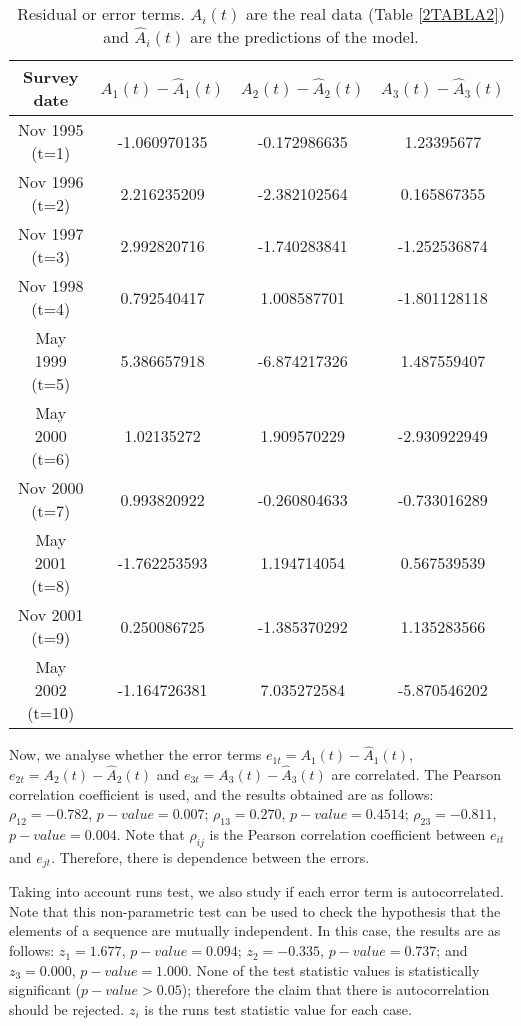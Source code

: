 \begin{table}[ht]
\centering
\begin{tabular}{|cccc|}
\hline
  Survey date  & $A_1(t)-\hat{A}_1(t)$ & $A_2(t)-\hat{A}_2(t)$ & $A_3(t)-\hat{A}_3(t)$ \\   
\hline
 Nov 1995 (t=1)  &-1.060970135& -0.172986635& 1.23395677	\\
 Nov 1996 (t=2)  &2.216235209 &	-2.382102564& 0.165867355\\
 Nov 1997 (t=3)  & 2.992820716&	-1.740283841& -1.252536874\\
 Nov 1998 (t=4)  & 0.792540417&	1.008587701& -1.801128118 \\
 May 1999 (t=5)   & 5.386657918&	-6.874217326& 1.487559407\\
 May 2000 (t=6)   & 1.02135272&1.909570229	& -2.930922949\\
 Nov 2000 (t=7)  & 0.993820922&  -0.260804633 & -0.733016289\\
 May 2001 (t=8)   & -1.762253593&	1.194714054& 0.567539539\\
 Nov 2001 (t=9)  & 0.250086725&	-1.385370292	& 1.135283566\\
 May 2002 (t=10) & -1.164726381	&	7.035272584& -5.870546202\\    
 \hline 
\end{tabular} 
\caption{Residual or error terms. $A_i(t)$ are the real data (Table \ref{2TABLA2}) and $\hat{A}_i(t)$ are the predictions of the model.} 
\label{2TABLAERRORES} 
\end{table}   

Now, we analyse whether the error terms $e_{1t} = A_1(t)-\hat{A}_1(t)$, $e_{2t} = A_2(t)-\hat{A}_2(t)$ and $e_{3t} = A_3(t)-\hat{A}_3(t)$ are correlated. The Pearson correlation coefficient is used, and the results obtained are as follows: $\rho_{12}=-0.782$, $p-value=0.007$; $\rho_{13}=0.270$, $p-value=0.4514$; $\rho_{23}=-0.811$, $p-value=0.004$. Note that $\rho_{ij}$ is the Pearson correlation coefficient between $e_{it}$ and $e_{jt}$. Therefore, there is dependence between the errors.

Taking into account runs test, we also study if each error term is autocorrelated. Note that this non-parametric test can be used to check the hypothesis that the elements of a sequence are mutually independent. In this case, the results are as follows: $z_1=1.677$, $p-value=0.094$; $z_2=-0.335$, $p-value=0.737$; and $z_3=0.000$, $p-value=1.000$. None of the test statistic values is statistically significant ($p-value>0.05$); therefore the claim that there is autocorrelation should be rejected. $z_i$ is the runs test statistic value for each case. 


